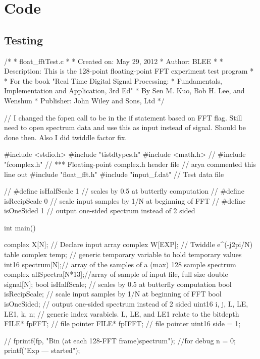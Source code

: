 \documentclass{bannerReport}
\begin{document}
\onecolumn
\newpage
\section{Code}
	\subsection{Testing}
		\begin{code}
/*
* float_fftTest.c
*
*  Created on: May 29, 2012
*      Author: BLEE
*
*  Description: This is the 128-point floating-point FFT experiment test 
program
*
*  For the book "Real Time Digital Signal Processing:
*                Fundamentals, Implementation and Application, 3rd Ed"
*                By Sen M. Kuo, Bob H. Lee, and Wenshun
*                Publisher: John Wiley and Sons, Ltd
*/


// I changed the fopen call to be in the if statement based on FFT flag. 
Still need to open spectrum data and use this as input instead of signal. 
Should be
	done then. Also I did twiddle factor fix.

#include <stdio.h>
#include "tistdtypes.h"
#include <math.h>   
// #include "fcomplex.h"	// *** Floating-point complex.h header file  //
	arya commented this line out
#include "float_fft.h"
#include "input_f.dat"	// Test data file 
						


// #define isHalfScale		1	// scales by 0.5 at butterfly computation
// #define isRecipScale	0	// scale input samples by 1/N at beginning of 
FFT
// #define isOneSided			1	// output one-sided spectrum instead of 
2 
sided

int main()
{	
	complex X[N];		// Declare input array  
	complex W[EXP];		// Twiddle e^(-j2pi/N) table 
	complex temp;		// generic temporary variable to hold temporary 
	values
	int16   spectrum[N];// array of the samples of a (max) 128 sample 
	spectrum
	complex	allSpectra[N*13];//array of sample of input file, full size
	double   signal[N];
	bool isHalfScale;		// scales by 0.5 at butterfly computation
	bool isRecipScale;	// scale input samples by 1/N at beginning of FFT
	bool isOneSided;		// output one-sided spectrum instead of 2 sided
	uint16 i, j, L, LE, LE1, k, n; // generic index varabiels. L, LE, and 
	LE1
		relate to the bitdepth
	FILE* fpFFT;  // file pointer
	FILE* fpIFFT; // file pointer
	uint16 side = 1;

	// fprintf(fp, "Bin (at each 128-FFT frame)\tFFT spectrum\n"); //for 
	debug
	n = 0;
	printf("Exp --- started\n");
	
}
\end{code}
\end{document}
